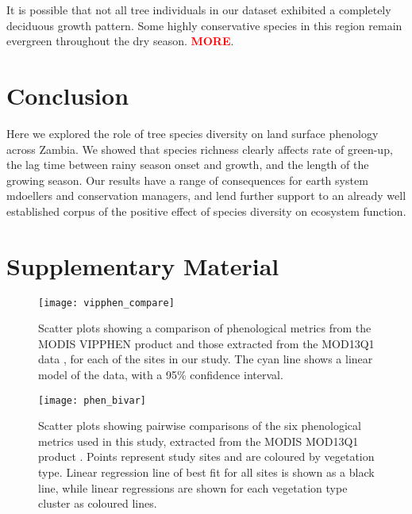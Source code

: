 \documentclass[11pt,a4paper]{article}
\newcommand{\todo}[1]{\textcolor{red}{\textbf{#1}}}  %
\newcommand{\beginsupplement}{%
	\setcounter{table}{0}
	\renewcommand{\thetable}{S\arabic{table}}%
	\setcounter{figure}{0}
	\renewcommand{\thefigure}{S\arabic{figure}}%
	}
\begin{document}
It is possible that not all tree individuals in our dataset exhibited a completely deciduous growth pattern. Some highly conservative species in this region remain evergreen throughout the dry season. \todo{MORE}.

\section{Conclusion}

Here we explored the role of tree species diversity on land surface phenology across Zambia. We showed that species richness clearly affects rate of green-up, the lag time between rainy season onset and growth, and the length of the growing season. Our results have a range of consequences for earth system mdoellers and conservation managers, and lend further support to an already well established corpus of the positive effect of species diversity on ecosystem function.

\printbibliography

\section{Supplementary Material}
\beginsupplement

\begin{figure}[H]
\centering
	\texttt{[image: vipphen\_compare]}
	\caption{Scatter plots showing a comparison of phenological metrics from the MODIS VIPPHEN product \citep{VIPPHEN} and those extracted from the MOD13Q1 data \citep{MOD13Q1}, for each of the sites in our study. The cyan line shows a linear model of the data, with a 95\% confidence interval.}
	\label{vipphen_compare}
\end{figure}



\begin{figure}[H]
\centering
	\texttt{[image: phen\_bivar]}
	\caption{Scatter plots showing pairwise comparisons of the six phenological metrics used in this study, extracted from the MODIS MOD13Q1 product \citep{MOD13Q1}. Points represent study sites and are coloured by vegetation type. Linear regression line of best fit for all sites is shown as a black line, while linear regressions are shown for each vegetation type cluster as coloured lines.}
	\label{phen_bivar}
\end{figure}


\end{document}
